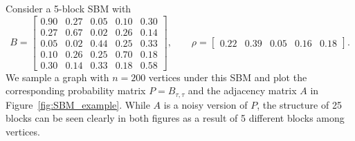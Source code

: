 \begin{example}
\label{example:SBM}
Consider a 5-block SBM with 
\begin{equation*}
B = \begin{bmatrix}
0.90 & 0.27 & 0.05 & 0.10 & 0.30 \\
0.27 & 0.67 & 0.02 & 0.26 & 0.14 \\
0.05 & 0.02 & 0.44 & 0.25 & 0.33 \\
0.10 & 0.26 & 0.25 & 0.70 & 0.18 \\
0.30 & 0.14 & 0.33 & 0.18 & 0.58
\end{bmatrix}
,\qquad \rho = \begin{bmatrix}
0.22 & 0.39 & 0.05 & 0.16 & 0.18
\end{bmatrix}.
\end{equation*}
We sample a graph with $n = 200$ vertices under this SBM and plot the corresponding probability matrix $P = B_{\tau, \tau}$ and the adjacency matrix $A$ in Figure~\ref{fig:SBM_example}. While $A$ is a noisy version of $P$, the structure of 25 blocks can be seen clearly in both figures as a result of 5 different blocks among vertices.
\end{example}

